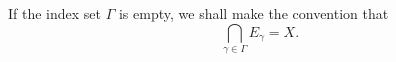 If the index set $\Gamma$ is empty, we shall make the convention that
$$\bigcap_{\gamma \in \Gamma} E_\gamma = X.$$
